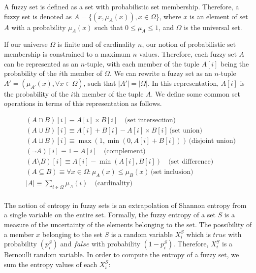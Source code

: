 \documentclass[11pt]{book}
\newcommand{\card}[1]{\left| #1 \right|}
\begin{document}
A fuzzy set is defined as a set with probabilistic set membership. Therefore, a
fuzzy set is denoted as $A = \{ (x, \mu_A(x)), x \in \Omega\}$,  where $x$ is
an element of set $A$ with a probability $\mu_A(x)$ such that $0 \leq \mu_A
\leq 1$, and $\Omega$ is the universal set. 

If our universe $\Omega$ is finite and of cardinality $n$, our notion of
probabilistic set membership is constrained to a maximum $n$ values. Therefore,
each fuzzy set $A$ can be represented as an $n$-tuple, with each member of the
tuple $A[i]$ being the probability of the $i$th member of $\Omega$. We can
rewrite a fuzzy set as an $n$-tuple $A' = ( \mu_{A'}(x), \forall x \in \Omega
)$, such that $\card{A'} = \card \Omega$. In this representation, $A[i]$ is the
probability of the $i$th member of the tuple $A$. We define some common set
operations in terms of this representation as follows.

{\footnotesize \begin{align*} &(A \cap B)[i] \equiv  A[i] \times B[i] \quad
\text{(set intersection)} \\ &(A \cup B)[i] \equiv  A[i] + B[i]  - A[i] \times
B[i] \, \text{(set union)}\\ &(A \sqcup B)[i] \equiv  \max(1, \min(0, A[i] +
B[i])) \, \text{(disjoint union)}\\ &(\lnot A)[i] \equiv 1 - A[i] \quad
\text{(complement)}\\ &(A \setminus B)[i] \equiv A[i]  - \min(A[i], B[i]) \quad
\text{(set difference)} \\ &(A \subseteq B) \equiv \forall x \in \Omega:
\mu_A(x) \leq \mu_B(x) \, \text{(set inclusion)}\\ &\card A \equiv \sum_{i \in
\Omega} \mu_A (i) \quad \text{(cardinality)} \\
\end{align*} }

The notion of entropy in fuzzy sets is an extrapolation of Shannon entropy from
a single variable on the entire set. Formally, the fuzzy entropy of a set $S$
is a measure of the uncertainty of the elements belonging to the set. The
possibility of a member $x$ belonging to the set $S$ is a random variable
$X_i^S$ which is $true$ with probability $(p_i^S)$ and $false$ with probability
$(1-p^S_i)$. Therefore, $X_i^S$ is a Bernoulli random variable. In order to
compute the entropy of a fuzzy set, we sum the entropy values of each $X_i^S$:
\end{document}
